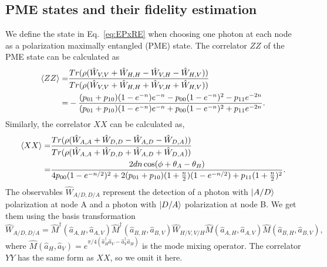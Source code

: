 \documentclass[aps,reprint,showpacs,superscriptaddress]{revtex4-2}
\begin{document}
\subsection{PME states and their fidelity estimation}
We define the state in Eq.~\ref{eq:EPxRE} when choosing one photon at each node as a polarization maximally entangled (PME) state. The correlator $ZZ$ of the PME state can be calculated as
\begin{equation}
	\begin{split}
	\braket{ZZ}=&\frac{Tr(\rho(\hat{W}_{V,V}+\hat{W}_{H,H}-\hat{W}_{V,H}-\hat{W}_{H,V}))}{Tr(\rho(\hat{W}_{V,V}+\hat{W}_{H,H}+\hat{W}_{V,H}+\hat{W}_{H,V}))}\\
	=&-\frac{(p_{01}+p_{10})(1-e^{-n})e^{-n}-p_{00}(1-e^{-n})^2-p_{11}e^{-2n}}{(p_{01}+p_{10})(1-e^{-n})e^{-n}+p_{00}(1-e^{-n})^2+p_{11}e^{-2n}}.
	\end{split}
\end{equation}
Similarly, the correlator $XX$ can be calculated as,
\begin{equation}
	\begin{split}
	\braket{XX}=&\frac{Tr(\rho(\hat{W}_{A,A}+\hat{W}_{D,D}-\hat{W}_{A,D}-\hat{W}_{D,A}))}{Tr(\rho(\hat{W}_{A,A}+\hat{W}_{D,D}+\hat{W}_{A,D}+\hat{W}_{D,A}))}\\
	=&\frac{2dn\cos(\phi+\theta_{A}-\theta_{B})}{4p_{00}(1-e^{-n/2})^2+2(p_{01}+p_{10})(1+\frac{n}{2})(1-e^{-n/2})+p_{11}(1+\frac{n}{2})^2}.
	\label{eq: XY visibility}
	\end{split}
\end{equation}
The observables $\hat{W}_{A/D,D/A}$ represent the detection of a photon with $\ket{A/D}$ polarization at node A  and a photon with $\ket{D/A}$ polarization at node B. We get them using the basis transformation
\begin{equation}
	\hat{W}_{A/D,D/A}=\hat{M}^\dagger(\hat{a}_{A,H},\hat{a}_{A,V})\hat{M}^\dagger(\hat{a}_{B,H},\hat{a}_{B,V})\hat{W}_{H/V,V/H}\hat{M}(\hat{a}_{A,H},\hat{a}_{A,V})\hat{M}(\hat{a}_{B,H},\hat{a}_{B,V}),
\end{equation}
where $\hat{M}(\hat{a}_{H},\hat{a}_{V})=e^{\pi/4(\hat{a}_H^\dagger\hat{a}_V-\hat{a}_V^\dagger\hat{a}_H)}$ is the mode mixing operator. The correlator $YY$ has the same form as $XX$, so we omit it here.
\end{document}
